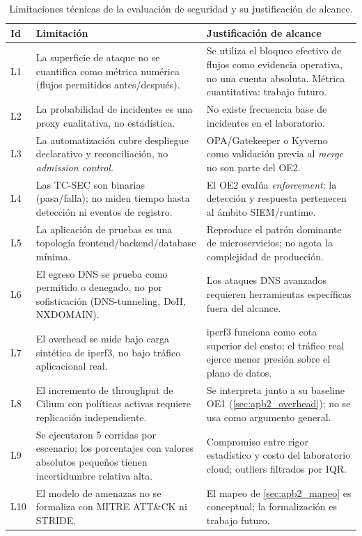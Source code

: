 \begin{table}[htbp]
\centering
\scriptsize
\caption{Limitaciones técnicas de la evaluación de seguridad y su justificación de alcance.}
\label{tab:apb2_limitaciones}
\begin{tabularx}{\textwidth}{|l|Y|Y|}
\hline
\textbf{Id} & \textbf{Limitación} & \textbf{Justificación de alcance} \\
\hline
L1 & La superficie de ataque no se cuantifica como métrica numérica (flujos permitidos antes/después). & Se utiliza el bloqueo efectivo de flujos como evidencia operativa, no una cuenta absoluta. Métrica cuantitativa: trabajo futuro. \\
\hline
L2 & La probabilidad de incidentes es una proxy cualitativa, no estadística. & No existe frecuencia base de incidentes en el laboratorio. \\
\hline
L3 & La automatización cubre despliegue declarativo y reconciliación, no \emph{admission control}. & OPA/Gatekeeper o Kyverno como validación previa al \emph{merge} no son parte del OE2. \\
\hline
L4 & Las TC-SEC son binarias (pasa/falla); no miden tiempo hasta detección ni eventos de registro. & El OE2 evalúa \emph{enforcement}; la detección y respuesta pertenecen al ámbito SIEM/runtime. \\
\hline
L5 & La aplicación de pruebas es una topología frontend/backend/database mínima. & Reproduce el patrón dominante de microservicios; no agota la complejidad de producción. \\
\hline
L6 & El egreso DNS se prueba como permitido o denegado, no por sofisticación (DNS-tunneling, DoH, NXDOMAIN). & Los ataques DNS avanzados requieren herramientas específicas fuera del alcance. \\
\hline
L7 & El overhead se mide bajo carga sintética de iperf3, no bajo tráfico aplicacional real. & iperf3 funciona como cota superior del costo; el tráfico real ejerce menor presión sobre el plano de datos. \\
\hline
L8 & El incremento de throughput de Cilium con políticas activas requiere replicación independiente. & Se interpreta junto a su baseline OE1 (\cref{sec:apb2_overhead}); no se usa como argumento general. \\
\hline
L9 & Se ejecutaron 5 corridas por escenario; los porcentajes con valores absolutos pequeños tienen incertidumbre relativa alta. & Compromiso entre rigor estadístico y costo del laboratorio cloud; outliers filtrados por IQR. \\
\hline
L10 & El modelo de amenazas no se formaliza con MITRE ATT\&CK ni STRIDE. & El mapeo de \cref{sec:apb2_mapeo} es conceptual; la formalización es trabajo futuro. \\
\hline
\end{tabularx}
\end{table}

